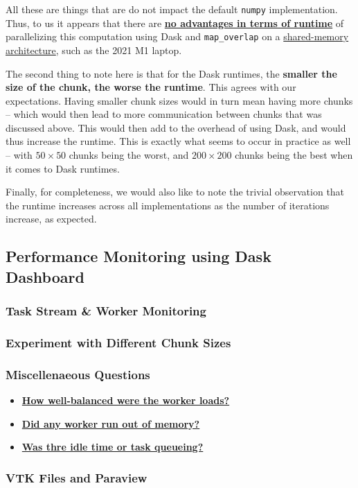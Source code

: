 \documentclass[a4paper,12pt]{article}
\begin{document}
All these are things that are do not impact the default \verb|numpy| implementation. Thus, to us it appears that there are \textbf{\underline{no advantages in terms of runtime}} of parallelizing this computation using Dask and \verb|map_overlap| on a \underline{shared-memory architecture}, such as the 2021 M1 laptop. 

The second thing to note here is that for the Dask runtimes, the \textbf{smaller the size of the chunk, the worse the runtime}. This agrees with our expectations. Having smaller chunk sizes would in turn mean having more chunks -- which would then lead to more communication between chunks that was discussed above. This would then add to the overhead of using Dask, and would thus increase the runtime. This is exactly what seems to occur in practice as well -- with $50 \times 50$ chunks being the worst, and $200 \times 200$ chunks being the best when it comes to Dask runtimes. 

Finally, for completeness, we would also like to note the trivial observation that the runtime increases across all implementations as the number of iterations increase, as expected. 

\subsection{Performance Monitoring using Dask Dashboard}

\subsubsection{Task Stream \& Worker Monitoring}

\subsubsection{Experiment with Different Chunk Sizes}

\subsubsection{Miscellenaeous Questions}

\begin{itemize}
\item \textbf{\underline{How well-balanced were the worker loads?}}
\item \textbf{\underline{Did any worker run out of memory?}}
\item \textbf{\underline{Was thre idle time or task queueing?}}
\end{itemize}

\subsubsection{VTK Files and Paraview}



\end{document}

